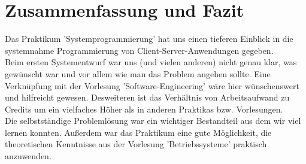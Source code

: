 \section{Zusammenfassung und Fazit}

Das Praktikum 'Systemprogrammierung' hat uns einen tieferen Einblick in die
systemnahme Programmierung von Client-Server-Anwendungen gegeben. \\
Beim ersten Systementwurf war uns (und vielen anderen) nicht genau klar,
was gewünscht war und vor allem wie man das Problem angehen sollte.
Eine Verknüpfung mit der Vorlesung 'Software-Engineering' wäre hier wünschenswert
und hilfreicht gewesen. Desweiteren ist das Verhältnis von Arbeitsaufwand zu
Credits um ein vielfaches Höher als in anderen Praktikas bzw. Vorlesungen. \\
Die selbstständige Problemlösung war ein wichtiger Bestandteil aus dem wir
viel lernen konnten. Außerdem war das Praktikum eine gute Möglichkeit,
die theoretischen Kenntnisse aus der Vorlesung 'Betriebssysteme' praktisch
anzuwenden.